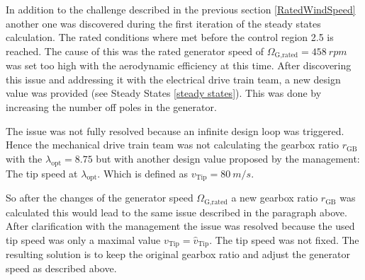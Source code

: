 In addition to the challenge described in the previous section \ref{RatedWindSpeed} another one was discovered during the first iteration of the steady states calculation. The rated conditions where met before the control region 2.5 is reached. The cause of this was the rated generator speed of $\Omega_{\text{G,rated}} = \SI{458}{rpm}$ was set too high with the aerodynamic efficiency at this time. After discovering this issue and addressing it with the electrical drive train team, a new design value was provided (see Steady States \ref{steady states}). This was done by increasing the number off poles in the generator.

The issue was not fully resolved because an infinite design loop was triggered. Hence the mechanical drive train team was not calculating the gearbox ratio $r_{\text{GB}}$ with the $\lambda_{\text{opt}} = 8.75$ but with another design value proposed by the management: The tip speed at $\lambda_{\text{opt}}$. 
Which is defined as $v_{\text{Tip}} = \SI{80}{m/s}$. 

So after the changes of the generator speed $\Omega_{\text{G,rated}}$ a new gearbox ratio $r_{\text{GB}}$ was calculated this would lead to the same issue described in the paragraph above. After clarification with the management the issue was resolved because the used tip speed was only a maximal value $v_{\text{Tip}} = \hat{v}_{\text{Tip}}$. The tip speed was not fixed. The resulting solution is to keep the original gearbox ratio and adjust the generator speed as described above.      